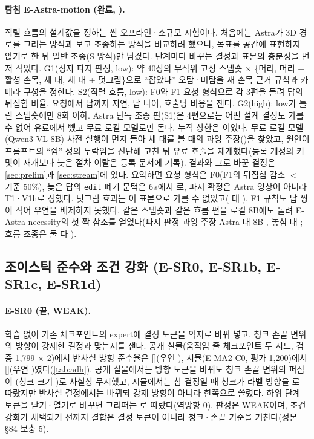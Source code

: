 \paragraph{탐침 E-Astra-motion (완료, ).} 직렬 흐름의 설계값을 정하는 싼 오프라인·소규모 시험이다. 처음에는 Astra가 3D 경로를 그리는 방식과 보고 조종하는 방식을 비교하려 했으나, 목표를 공간에 표현하지 않기로 한 뒤 일반 조종(S 방식)만 남겼다. 단계마다 바꾸는 결정과 표본의 충분성을 먼저 적었다. G1(정지 파지 판정, low): 약 40장의 무작위 고정 스냅숏 $\times$ \{머리, 머리 + 활성 손목, 세 대, 세 대 + 덧그림\}으로 ``잡았다'' 오탐·미탐을 재 손목 근거 규칙과 카메라 구성을 정한다. S2(직렬 흐름, low): F0와 F1 요청 형식으로 각 3편을 돌려 답의 뒤집힘 비율, 요청에서 답까지 지연, 답 나이, 호출당 비용을 잰다. G2(high): low가 틀린 스냅숏에만 8회 이하. Astra 단독 조종 판(S1)은 4편으로는 어떤 설계 결정도 가를 수 없어 유료에서 뺐고 무료 로컬 모델로만 돈다. 누적 상한은 이었다. 무료 로컬 모델(Qwen3-VL-8B) 사전 실행이 먼저 돌아 세 대를 볼 때의 과잉 주장()을 찾았고, 원인이 프롬프트의 ``쥠'' 정의 누락임을 진단해 고친 뒤 유료 호출을 재개했다(등록 개정의 커밋이 재개보다 늦은 절차 이탈은 등록 문서에 기록). 결과와 그로 바꾼 결정은 \cref{sec:prelim}과 \cref{sec:stream}에 있다. 요약하면 요청 형식은 F0(F1의 뒤집힘 감소  $<$ 기준 50\%), 늦은 답의 \texttt{edit} 폐기 문턱은 6\,s에서 로, 파지 확정은 Astra 영상이 아니라 T1·V1h로 정했다. 덧그림 효과는 이 표본으로 가를 수 없었고( 대 ), F1 규칙도 답 쌍이 적어 우연을 배제하지 못했다. 같은 스냅숏과 같은 흐름 편을 로컬 8B에도 돌려 E-Astra-necessity의 첫 짝 참조를 얻었다(파지 판정 과잉 주장 Astra  대 8B , 놓침  대 ; 흐름 조종은 둘 다 ).

\subsection{조이스틱 준수와 조건 강화 (E-SR0, E-SR1b, E-SR1c, E-SR1d)}
\label{sec:plan_adh}
\paragraph{E-SR0 (끝, WEAK).} 학습 없이 기존 체크포인트의 expert에 결정 토큰을 억지로 바꿔 넣고, 청크 손끝 변위의 방향이 강제한 결정과 맞는지를 잰다. 공개 실물(움직임 줄 체크포인트 두 시드, 검증 1,799 $\times$ 2)에서 반사실 방향 준수율은  [](우연 ), 시뮬(E-MA2 C0, 평가 1,200)에서  [](우연 )였다(\cref{tab:adh}). 공개 실물에서는 방향 토큰을 바꿔도 청크 손끝 변위의 퍼짐이 (청크 크기 )로 사실상 무시했고, 시뮬에서는 참 결정일 때 청크가 라벨 방향을 로 따랐지만 반사실 결정에서는  바뀌되 강제 방향이 아니라 한쪽으로 쏠렸다. 하위 단계 토큰을 닫기·열기로 바꾸면 그리퍼는 로 따랐다(역방향 0). 판정은 WEAK이며, 조건 강화가 채택되기 전까지 결합은 결정 토큰이 아니라 청크·손끝 기준을 거친다(정본 §84 보충 5).

